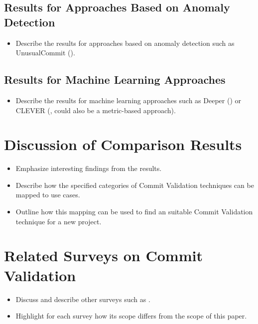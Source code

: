 \subsection{Results for Approaches Based on Anomaly Detection}
\begin{itemize}
\item Describe the results for approaches based on anomaly detection such as UnusualCommit (\cite{Goyal2017}).
\end{itemize}
\subsection{Results for Machine Learning Approaches}
\begin{itemize}
\item Describe the results for machine learning approaches such as Deeper (\cite{Yang2015}) or CLEVER (\cite{Nayrolles2018}, could also be a metric-based approach).
\end{itemize}



\section{Discussion of Comparison Results}
\begin{itemize}
	\item Emphasize interesting findings from the results.
	\item Describe how the specified categories of Commit Validation techniques can be mapped to use cases.
	\item Outline how this mapping can be used to find an suitable Commit Validation technique for a new project.
\end{itemize}


\section{Related Surveys on Commit Validation}
\begin{itemize}
	\item Discuss and describe other surveys such as \cite{Kim2008,Catolino2019,Syed2019,Yang2016}.
	\item Highlight for each survey how its scope differs from the scope of this paper.
\end{itemize}


